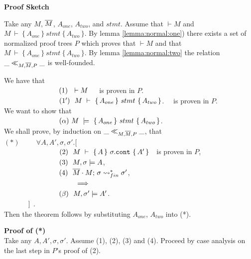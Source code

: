 \noindent
\vspace{.2cm}
  {\textbf{Proof Sketch}} 

Take any $M$, $\overline{M}$, $A_{one}$, $A_{two}$, and $stmt$. Assume that $\vdash M$  and 
$M\ \vdash\  \{\, A_{one} \,  \}\ stmt\  \{\, A_{two} \, \}$.
By lemma  \ref{lemma:normal:one}) there exists a set of normalized 
proof trees $P$ which proves that $\vdash M$ and that $M\ \vdash\  \{\, A_{one} \,  \}\ stmt\  \{\, A_{two}\, \}$.
By lemma \ref{lemma:normal:two} the relation $\_ \ll_{M,\overline{M},P}  \_$ is well-founded.
 
 We have that \\
 $\strut \ \ \hspace{2.3cm} \ \ (1) \ \ \vdash M $\ \ \  is proven in $P$.\\
$\strut \ \ \hspace{2.3cm} \ \ (1') \ \ M\ \vdash\  \{\, A_{one} \,  \}\ stmt\  \{\, A_{two} \, \}$. \ \  is proven in $P$.
\\
We want to show  that\\
 $\strut \ \ \hspace{2.3cm} \ \ (\alpha) \  M\ \models\  \{\, A_{one} \,  \}\ stmt\  \{\, A_{two} \, \}$. 
 \\ 
We shall prove,  by induction on $\_ \ll_{M,\overline{M},P}  \_$, that 
\\ 
$(*) \hspace{1cm} \forall A, A', \sigma, \sigma'.[$\\
$\strut \ \ \hspace{2.3cm} \ \ (2) \ \ M\ \vdash\  \{\, A \,  \}\ \sigma.\prg{cont}\  \{\, A' \, \}\ \ $ is proven in $P$,\\
$\strut \ \ \hspace{2.3cm} \ \ (3) \ \ M, \sigma \models A$, \\
$\strut \ \ \hspace{2.3cm} \ \ (4) \ \ \leadstoBoundedStarFin {\Mtwo\cdot M}  {\sigma}  {\sigma'}$,\\
$\strut \ \ \hspace{2.3cm} \ \ \ \ \ \ \ \ \ \Longrightarrow$\\
$\strut  \ \ \hspace{2.3cm} \ \ (\beta)\ \  M, \sigma' \models A'$.\\
$\strut \ \   \hspace{1cm} ]$
.
\\
Then the  theorem follows by substituting $A_{one}$, $A_{two}$ into (*).

\vspace{.1cm}
\noindent
\textbf{Proof of (*)}\\
Take any $A, A', \sigma, \sigma'$. Assume  (1), (2), (3) and (4).
Proceed by case analysis on the last step in $P$'s proof of (2).


